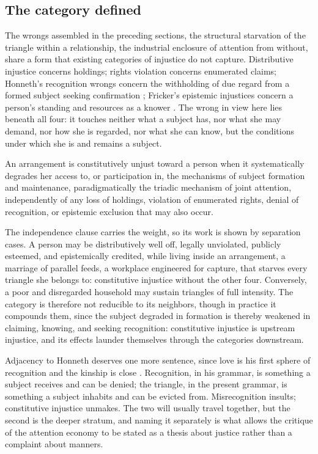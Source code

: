 \subsection{The category defined}

The wrongs assembled in the preceding sections, the structural starvation of the triangle within a relationship, the industrial enclosure of attention from without, share a form that existing categories of injustice do not capture. Distributive injustice concerns holdings; rights violation concerns enumerated claims; Honneth's recognition wrongs concern the withholding of due regard from a formed subject seeking confirmation \parencite{honneth1995}; Fricker's epistemic injustices concern a person's standing and resources as a knower \parencite{fricker2007}. The wrong in view here lies beneath all four: it touches neither what a subject has, nor what she may demand, nor how she is regarded, nor what she can know, but the conditions under which she is and remains a subject.

\begin{defn}\label{p05:def:ci}
An arrangement is constitutively unjust toward a person when it systematically degrades her access to, or participation in, the mechanisms of subject formation and maintenance, paradigmatically the triadic mechanism of joint attention, independently of any loss of holdings, violation of enumerated rights, denial of recognition, or epistemic exclusion that may also occur.
\end{defn}

The independence clause carries the weight, so its work is shown by separation cases. A person may be distributively well off, legally unviolated, publicly esteemed, and epistemically credited, while living inside an arrangement, a marriage of parallel feeds, a workplace engineered for capture, that starves every triangle she belongs to: constitutive injustice without the other four. Conversely, a poor and disregarded household may sustain triangles of full intensity. The category is therefore not reducible to its neighbors, though in practice it compounds them, since the subject degraded in formation is thereby weakened in claiming, knowing, and seeking recognition: constitutive injustice is upstream injustice, and its effects launder themselves through the categories downstream.

Adjacency to Honneth deserves one more sentence, since love is his first sphere of recognition and the kinship is close \parencite{honneth1995}. Recognition, in his grammar, is something a subject receives and can be denied; the triangle, in the present grammar, is something a subject inhabits and can be evicted from. Misrecognition insults; constitutive injustice unmakes. The two will usually travel together, but the second is the deeper stratum, and naming it separately is what allows the critique of the attention economy to be stated as a thesis about justice rather than a complaint about manners.

